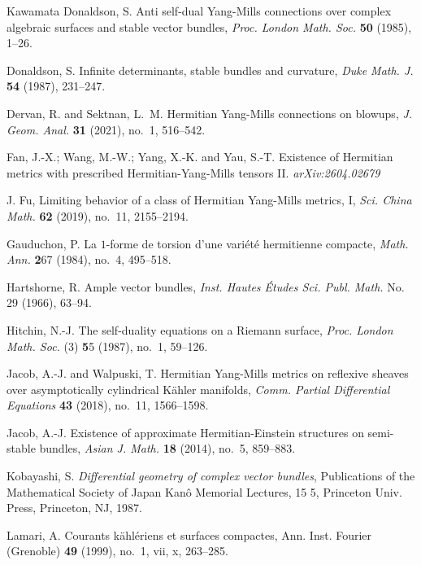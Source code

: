 \documentclass[12pt, reqno]{amsart}
\theoremstyle{plain}
\theoremstyle{definition}
\renewcommand{\>}{\rightarrow}
\renewcommand{\>}{\rightarrow}
\numberwithin{equation}{section} %
\begin{document}
\begin{thebibliography}{Kawamata}
    Donaldson, S. Anti self-dual Yang-Mills connections over complex algebraic surfaces and stable vector bundles,
    \emph{Proc. London Math. Soc.} \textbf{50} (1985), 1--26.

    Donaldson, S.  Infinite determinants, stable bundles and curvature,
    \emph{Duke Math. J.} \textbf{54} (1987), 231--247.

    Dervan, R.  and  Sektnan, L.~M. Hermitian Yang-Mills connections on blowups,\emph{ J. Geom. Anal. }{\bf 31} (2021), no.~1, 516--542.




     Fan, J.-X.; Wang, M.-W.; Yang, X.-K. and Yau, S.-T. Existence of Hermitian metrics  with  prescribed Hermitian-Yang-Mills tensors  II.  \emph{arXiv:2604.02679}



    J. Fu, Limiting behavior of a class of Hermitian Yang-Mills metrics, I, \emph{Sci. China Math.} {\bf 62} (2019), no.~11, 2155--2194.

    Gauduchon, P. La $1$-forme de torsion d'une vari\'et\'e{} hermitienne compacte, \emph{Math. Ann.} {\textbf 267} (1984), no.~4, 495--518.



    Hartshorne, R. Ample vector bundles, \emph{Inst. Hautes \'Etudes Sci. Publ. Math.} No. 29 (1966), 63--94.


    Hitchin, N.-J. The self-duality equations on a Riemann surface, \emph{Proc. London Math. Soc.} (3) {\textbf 55} (1987), no.~1, 59--126.

Jacob, A.-J.  and Walpuski, T.  Hermitian Yang-Mills metrics on
reflexive sheaves over asymptotically cylindrical K\"ahler
manifolds, \emph{Comm. Partial Differential Equations} {\bf 43}
(2018), no.~11, 1566--1598.

    Jacob, A.-J.     Existence of approximate Hermitian-Einstein structures on semi-stable bundles, \emph{Asian J. Math.} {\bf 18} (2014), no.~5, 859--883.

Kobayashi, S. {\it Differential geometry of complex vector bundles}, Publications of the Mathematical Society of Japan Kan\^o{} Memorial Lectures, 15 5, Princeton Univ. Press, Princeton, NJ, 1987.

 Lamari, A. Courants k\"ahl\'eriens et surfaces compactes, Ann. Inst. Fourier (Grenoble) {\bf 49} (1999), no.~1, vii, x, 263--285.



\end{thebibliography}
\end{document}
